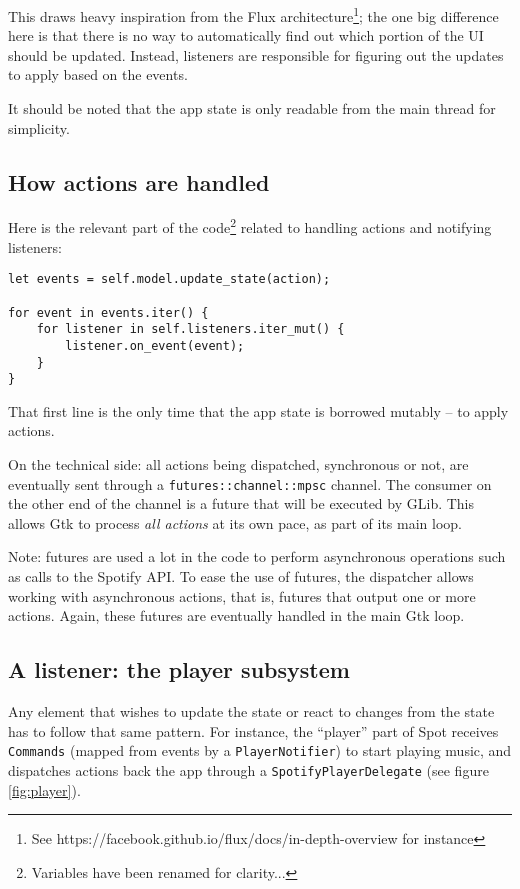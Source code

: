 \documentclass[12pt, a4paper]{article}
\begin{document}
This draws heavy inspiration from the Flux architecture\footnote{See https://facebook.github.io/flux/docs/in-depth-overview for instance}; the one big difference here is that there is no way to automatically find out which portion of the UI should be updated. Instead, listeners are responsible for figuring out the updates to apply based on the events.

It should be noted that the app state is only readable from the main thread for simplicity. 

\subsection{How actions are handled}

Here is the relevant part of the code\footnote{Variables have been renamed for clarity...} related to handling actions and notifying listeners:

\begin{verbatim}
let events = self.model.update_state(action);

for event in events.iter() {
    for listener in self.listeners.iter_mut() { 
        listener.on_event(event);
    }
}
\end{verbatim}

That first line is the only time that the app state is borrowed mutably -- to apply actions.

On the technical side: all actions being dispatched, synchronous or not, are eventually sent through a \texttt{futures::channel::mpsc} channel. The consumer on the other end of the channel is a future that will be executed by GLib. This allows Gtk to process \emph{all actions} at its own pace, as part of its main loop.

Note: futures are used a lot in the code to perform asynchronous operations such as calls to the Spotify API. To ease the use of futures, the dispatcher allows working with asynchronous actions, that is, futures that output one or more actions. Again, these futures are eventually handled in the main Gtk loop.

\subsection{A listener: the player subsystem}

Any element that wishes to update the state or react to changes from the state has to follow that same pattern. For instance, the ``player'' part of Spot receives \texttt{Commands} (mapped from events by a \texttt{PlayerNotifier}) to start playing music, and dispatches actions back the app through a \texttt{SpotifyPlayerDelegate} (see figure \ref{fig:player}). 
\end{document}
